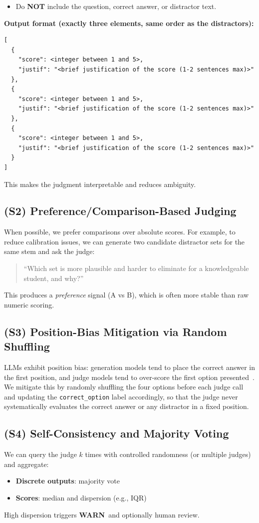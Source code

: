 \documentclass[11pt]{article}
\newcommand{\warn}{\textcolor{warnorange}{\textbf{WARN}}}
\begin{document}
\begin{tcolorbox}[colback=blue!3, colframe=blue!40, title=Judge prompt (Distractor Evaluation)]
\begin{itemize}[leftmargin=*, itemsep=0pt, topsep=0pt]
  \item Do \textbf{NOT} include the question, correct answer, or distractor text.
\end{itemize}
\medskip
\textbf{Output format (exactly three elements, same order as the distractors):}
\begin{Verbatim}[breaklines=true, fontsize=\small]
[
  {
    "score": <integer between 1 and 5>,
    "justif": "<brief justification of the score (1-2 sentences max)>"
  },
  {
    "score": <integer between 1 and 5>,
    "justif": "<brief justification of the score (1-2 sentences max)>"
  },
  {
    "score": <integer between 1 and 5>,
    "justif": "<brief justification of the score (1-2 sentences max)>"
  }
]
\end{Verbatim}
\end{tcolorbox}


This makes the judgment interpretable and reduces ambiguity.

\subsection{(S2) Preference/Comparison-Based Judging}
When possible, we prefer comparisons over absolute scores. For example, to reduce calibration issues, we can generate two candidate distractor sets for the same stem and ask the judge:
\begin{quote}
``Which set is more plausible and harder to eliminate for a knowledgeable student, and why?''
\end{quote}
This produces a \emph{preference} signal (A vs B), which is often more stable than raw numeric scoring.

\subsection{(S3) Position-Bias Mitigation via Random Shuffling}
LLMs exhibit position bias: generation models tend to place the correct answer in the first position, and judge models tend to over-score the first option presented~\cite{zheng2023judging}. We mitigate this by randomly shuffling the four options before each judge call and updating the \texttt{correct\_option} label accordingly, so that the judge never systematically evaluates the correct answer or any distractor in a fixed position.

\subsection{(S4) Self-Consistency and Majority Voting}
We can query the judge $k$ times with controlled randomness (or multiple judges) and aggregate:
\begin{itemize}[leftmargin=*]
  \item \textbf{Discrete outputs}: majority vote
  \item \textbf{Scores}: median and dispersion (e.g., IQR)
\end{itemize}
High dispersion triggers \warn\ and optionally human review.
\end{document}

